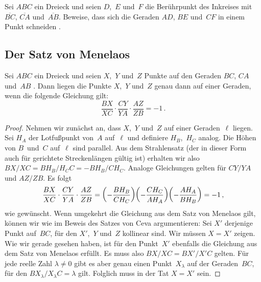 \begin{aufgabe*}
	Sei $ABC$ ein Dreieck und seien $D$,~$E$ und~$F$ die Berührpunkt des Inkreises mit $\overline{BC}$, $\overline{CA}$ und~$\overline{AB}$. Beweise, dass sich die Geraden $AD$, $BE$ und~$CF$ in einem Punkt schneiden .
\end{aufgabe*}

\subsection*{Der Satz von Menelaos}
\begin{satzmitnamen}
	Sei $ABC$ ein Dreieck und seien $X$,~$Y$ und~$Z$ Punkte auf den Geraden $BC$, $CA$ und~$AB$ . Dann liegen die Punkte $X$,~$Y$ und~$Z$ genau dann auf einer Geraden, wenn die folgende Gleichung  gilt:
	\begin{equation*}%
		\frac{BX}{XC}\cdot \frac{CY}{YA}\cdot \frac{AZ}{ZB}=-1\,.
	\end{equation*}
\end{satzmitnamen}

\begin{proof}
	Nehmen wir zunächst an, dass $X$,~$Y$ und~$Z$ auf einer Geraden~$\ell$ liegen. Sei $H_A$ der Lotfußpunkt von~$A$ auf~$\ell$ und definiere $H_B$,~$H_C$ analog. Die Höhen von $B$~und~$C$ auf~$\ell$ sind parallel. Aus dem Strahlensatz (der in dieser Form auch für gerichtete Streckenlängen gültig ist) erhalten wir also $BX/XC=BH_B/H_CC=-BH_B/CH_C$. Analoge Gleichungen gelten für $CY/YA$ und $AZ/ZB$. Es folgt
	\begin{equation*}
		\frac{BX}{XC}\cdot \frac{CY}{YA}\cdot \frac{AZ}{ZB}=\parens*{-\frac{BH_B}{CH_C}}\parens*{-\frac{CH_C}{AH_A}}\parens*{-\frac{AH_A}{BH_B}}=-1\,,
	\end{equation*}
	wie gewünscht. Wenn umgekehrt die Gleichung aus dem Satz von Menelaos gilt, können wir wie im Beweis des Satzes von Ceva argumentieren: Sei $X'$ derjenige Punkt auf~$BC$, für den $X'$,~$Y$ und~$Z$ kollinear sind. Wir müssen $X=X'$ zeigen. Wie wir gerade gesehen haben, ist für den Punkt~$X'$ ebenfalls die Gleichung aus dem Satz von Menelaos erfüllt. Es muss also $BX/XC=BX'/X'C$ gelten. Für jede reelle Zahl $\lambda\neq 0$ gibt es aber genau einen Punkt~$X_\lambda$ auf der Geraden~$BC$, für den $BX_\lambda/X_\lambda C=\lambda$ gilt. Folglich muss in der Tat $X=X'$ sein.
\end{proof}

